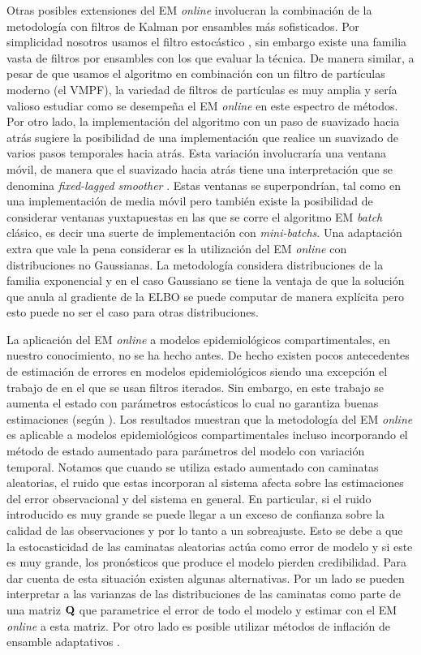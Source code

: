 Otras posibles extensiones del EM \textit{online} involucran la combinación de la metodología con filtros de Kalman por ensambles más sofisticados. Por simplicidad nosotros usamos el filtro estocástico \citep{Burgers1998}, sin embargo existe una familia vasta de filtros por ensambles con los que evaluar la técnica. De manera similar, a pesar de que usamos el algoritmo en combinación con un filtro de partículas moderno (el VMPF), la variedad de filtros de partículas es muy amplia y sería valioso estudiar como se desempeña el EM \textit{online} en este espectro de métodos. Por otro lado, la implementación del algoritmo con un paso de suavizado hacia atrás sugiere la posibilidad de una implementación que realice un suavizado de varios pasos temporales hacia atrás. Esta variación involucraría una ventana móvil, de manera que el suavizado hacia atrás tiene una interpretación que se denomina \textit{fixed-lagged smoother} \citep{Cosme2012}. Estas ventanas se superpondrían, tal como en una implementación de media móvil pero también existe la posibilidad de considerar ventanas yuxtapuestas en las que se corre el algoritmo EM \textit{batch} clásico, es decir una suerte de implementación con \textit{mini-batchs}. Una adaptación extra que vale la pena considerar es la utilización del EM \textit{online} con distribuciones no Gaussianas. La metodología considera distribuciones de la familia exponencial y en el caso Gaussiano se tiene la ventaja de que la solución que anula al gradiente de la ELBO se puede computar de manera explícita pero esto puede no ser el caso para otras distribuciones.

La aplicación del EM \textit{online} a modelos epidemiológicos compartimentales, en nuestro conocimiento, no se ha hecho antes. De hecho existen pocos antecedentes de estimación de errores en modelos epidemiológicos siendo una excepción el trabajo de \cite{Ionides2006} en el que se usan filtros iterados. Sin embargo, en este trabajo se aumenta el estado con parámetros estocásticos lo cual no garantiza buenas estimaciones (según \cite{Delsole2010}). Los resultados muestran que la metodología del EM \textit{online} es aplicable a modelos epidemiológicos compartimentales incluso incorporando el método de estado aumentado para parámetros del modelo con variación temporal. Notamos que cuando se utiliza estado aumentado con caminatas aleatorias, el ruido que estas incorporan al sistema afecta sobre las estimaciones del error observacional y del sistema en general. En particular, si el ruido introducido es muy grande se puede llegar a un exceso de confianza sobre la calidad de las observaciones y por lo tanto a un sobreajuste. Esto se debe a que la estocasticidad de las caminatas aleatorias actúa como error de modelo y si este es muy grande, los pronósticos que produce el modelo pierden credibilidad. Para dar cuenta de esta situación existen algunas alternativas. Por un lado se pueden interpretar a las varianzas de las distribuciones de las caminatas como parte de una matriz $\mathbf{Q}$ que parametrice el error de todo el modelo y estimar con el EM \textit{online} a esta matriz. Por otro lado es posible utilizar métodos de inflación de ensamble adaptativos \citep{Ruiz2013b}.


